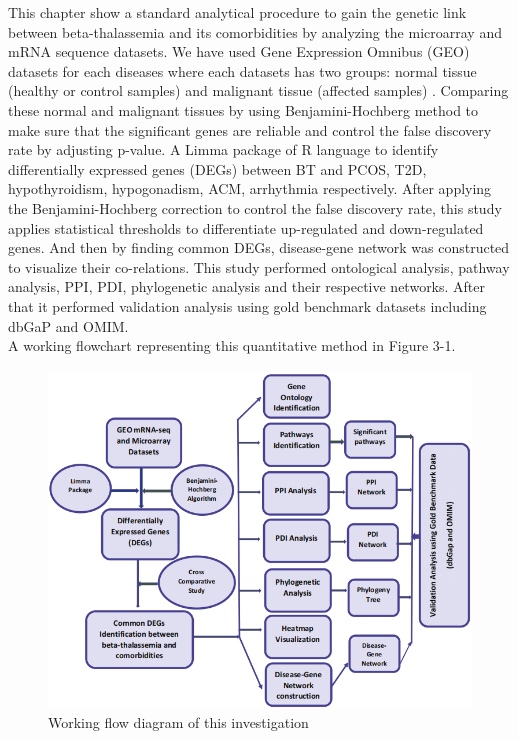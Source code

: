 This chapter show a standard analytical procedure to gain the genetic link between beta-thalassemia and its comorbidities by analyzing the microarray and mRNA sequence datasets. We have used Gene Expression Omnibus (GEO) datasets for each diseases where each datasets has two groups: normal tissue (healthy or control samples) and malignant tissue (affected samples) \cite{b13}. Comparing these normal and malignant tissues by using Benjamini-Hochberg method to make sure that the significant genes are reliable and control the false discovery rate by adjusting p-value. A Limma package of R language to identify differentially expressed genes (DEGs) between BT and PCOS, T2D, hypothyroidism, hypogonadism, ACM, arrhythmia respectively. After applying the Benjamini-Hochberg correction to control the false discovery rate, this study applies statistical thresholds to differentiate up-regulated and down-regulated genes. And then by finding common DEGs, disease-gene network was constructed to visualize their co-relations. This study performed ontological analysis, pathway analysis, PPI, PDI, phylogenetic analysis and their respective networks. After that it performed validation analysis using gold benchmark datasets including dbGaP and OMIM. \\

A working flowchart representing this quantitative method in Figure 3-1.

\begin{figure}[H]
    \centering
    \includegraphics[width=14cm]{./fig/p1.PNG}
    \caption{Working flow diagram of this investigation}
    \label{fig:dataset_mass_images}
\end{figure}


